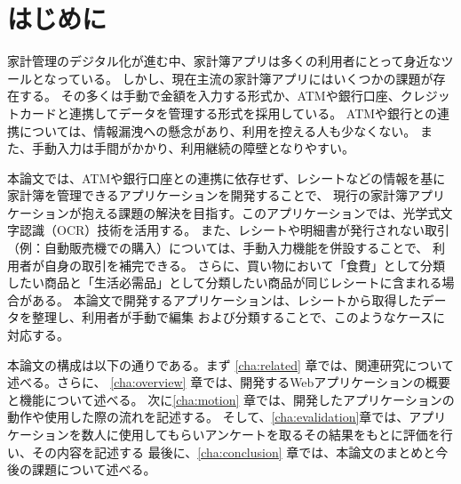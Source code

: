 \documentclass[main]{subfiles}
\begin{document}
\chapter{はじめに}
\label{cha:intro}

家計管理のデジタル化が進む中、家計簿アプリは多くの利用者にとって身近なツールとなっている。
しかし、現在主流の家計簿アプリにはいくつかの課題が存在する。
その多くは手動で金額を入力する形式か、ATMや銀行口座、クレジットカードと連携してデータを管理する形式を採用している。
ATMや銀行との連携については、情報漏洩への懸念があり、利用を控える人も少なくない。
また、手動入力は手間がかかり、利用継続の障壁となりやすい。

本論文では、ATMや銀行口座との連携に依存せず、レシートなどの情報を基に家計簿を管理できるアプリケーションを開発することで、
現行の家計簿アプリケーションが抱える課題の解決を目指す。このアプリケーションでは、光学式文字認識（OCR）技術を活用する。
また、レシートや明細書が発行されない取引（例：自動販売機での購入）については、手動入力機能を併設することで、
利用者が自身の取引を補完できる。
さらに、買い物において「食費」として分類したい商品と「生活必需品」として分類したい商品が同じレシートに含まれる場合がある。
本論文で開発するアプリケーションは、レシートから取得したデータを整理し、利用者が手動で編集
および分類することで、このようなケースに対応する。

本論文の構成は以下の通りである。まず \ref{cha:related} 章では、関連研究について述べる。さらに、
\ref{cha:overview} 章では、開発するWebアプリケーションの概要と機能について述べる。
次に\ref{cha:motion} 章では、開発したアプリケーションの動作や使用した際の流れを記述する。
そして、\ref{cha:evalidation}章では、アプリケーションを数人に使用してもらいアンケートを取るその結果をもとに評価を行い、その内容を記述する
最後に、\ref{cha:conclusion} 章では、本論文のまとめと今後の課題について述べる。
\end{document}
